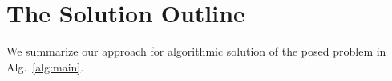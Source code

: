 \section{The Solution Outline}

%

We summarize our approach for algorithmic solution of the posed problem in Alg.~\ref{alg:main}.

